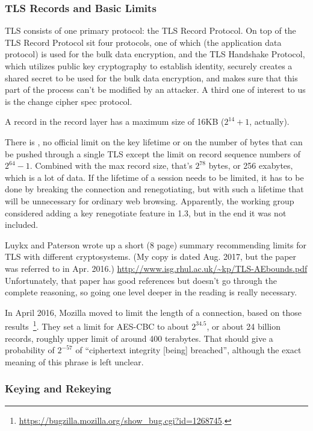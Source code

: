 \subsubsection{TLS Records and Basic Limits}

TLS consists of one primary protocol: the TLS Record Protocol.  On top
of the TLS Record Protocol sit four protocols, one of which (the
application data protocol) is used for the bulk data encryption, and
the TLS Handshake Protocol, which utilizes public key cryptography to
establish identity, securely creates a shared secret to be used for
the bulk data encryption, and makes sure that this part of the process
can't be modified by an attacker.  A third one of interest to us is
the change cipher spec protocol.

A record in the record layer has a maximum size of 16KB ($2^{14}+1$, actually).

There is , no official limit on the key lifetime or
on the number of bytes that can be pushed through a single TLS except
the limit on record sequence numbers of $2^{64}-1$.  Combined with the
max record size, that's $2^{78}$ bytes, or 256 exabytes, which is a 
lot of data.  If the lifetime of a session needs to be limited, it
has to be done by breaking the connection and renegotiating, but with
such a lifetime that will be unnecessary for ordinary web browsing.
Apparently, the working group considered adding a key renegotiate
feature in 1.3, but in the end it was not included.

Luykx and Paterson wrote up a short (8 page) summary recommending
limits for TLS with different cryptosystems. (My copy is dated
Aug. 2017, but the paper was referred to in Apr. 2016.)
\url{http://www.isg.rhul.ac.uk/~kp/TLS-AEbounds.pdf}
Unfortunately, that paper has good references but doesn't go through
the complete reasoning, so going one level deeper in the reading is
really necessary.

In April 2016, Mozilla moved to limit the length of a connection,
based on those
results~\footnote{\url{https://bugzilla.mozilla.org/show_bug.cgi?id=1268745}.}.
They set a limit for AES-CBC to about $2^{34.5}$, or about 24 billion records,
roughly upper limit of around 400 terabytes.  That should give a
probability of $2^{-57}$ of ``ciphertext integrity [being] breached'',
although the exact meaning of this phrase is left unclear.

\subsubsection{Keying and Rekeying}
\label{sec:tls-rekeying}

